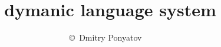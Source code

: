 





\title{\bi\ dymanic language system}
\author{\copyright\ Dmitry Ponyatov }


\maketitle
\tableofcontents
\clearpage
\secdown





